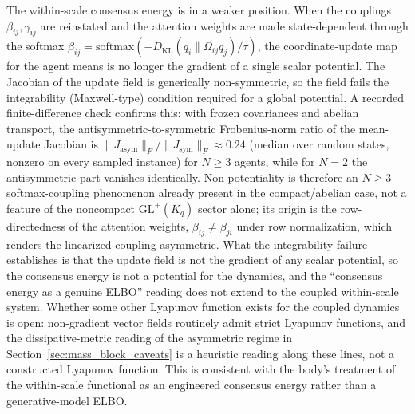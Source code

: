 \documentclass[11pt]{article}
\begin{document}
The within-scale consensus energy is in a weaker position. When the couplings $\beta_{ij}, \gamma_{ij}$ are reinstated and the attention weights are made state-dependent through the softmax $\beta_{ij} = \mathrm{softmax}(-D_{\mathrm{KL}}(q_i\|\Omega_{ij}q_j)/\tau)$, the coordinate-update map for the agent means is no longer the gradient of a single scalar potential. The Jacobian of the update field is generically non-symmetric, so the field fails the integrability (Maxwell-type) condition required for a global potential. A recorded finite-difference check confirms this: with frozen covariances and abelian transport, the antisymmetric-to-symmetric Frobenius-norm ratio of the mean-update Jacobian is $\|J_{\mathrm{asym}}\|_F/\|J_{\mathrm{sym}}\|_F \approx 0.24$ (median over random states, nonzero on every sampled instance) for $N \ge 3$ agents, while for $N = 2$ the antisymmetric part vanishes identically. Non-potentiality is therefore an $N \ge 3$ softmax-coupling phenomenon already present in the compact/abelian case, not a feature of the noncompact $\mathrm{GL}^+(K_q)$ sector alone; its origin is the row-directedness of the attention weights, $\beta_{ij} \ne \beta_{ji}$ under row normalization, which renders the linearized coupling asymmetric. What the integrability failure establishes is that the update field is not the gradient of any scalar potential, so the consensus energy is not a potential for the dynamics, and the ``consensus energy as a genuine ELBO'' reading does not extend to the coupled within-scale system. Whether some other Lyapunov function exists for the coupled dynamics is open: non-gradient vector fields routinely admit strict Lyapunov functions, and the dissipative-metric reading of the asymmetric regime in Section~\ref{sec:mass_block_caveats} is a heuristic reading along these lines, not a constructed Lyapunov function. This is consistent with the body's treatment of the within-scale functional as an engineered consensus energy rather than a generative-model ELBO.
\end{document}
